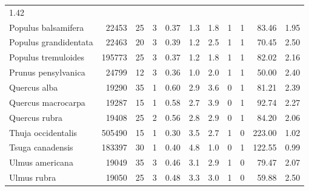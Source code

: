 \begin{longtable}[]{@{}lrrrrrrrrrr@{}}
1.42\tabularnewline
Populus balsamifera & 22453 & 25 & 3 & 0.37 & 1.3 & 1.8 & 1 & 1 & 83.46
& 1.95\tabularnewline
Populus grandidentata & 22463 & 20 & 3 & 0.39 & 1.2 & 2.5 & 1 & 1 &
70.45 & 2.50\tabularnewline
Populus tremuloides & 195773 & 25 & 3 & 0.37 & 1.2 & 1.8 & 1 & 1 & 82.02
& 2.16\tabularnewline
Prunus pensylvanica & 24799 & 12 & 3 & 0.36 & 1.0 & 2.0 & 1 & 1 & 50.00
& 2.40\tabularnewline
Quercus alba & 19290 & 35 & 1 & 0.60 & 2.9 & 3.6 & 0 & 1 & 81.21 &
2.39\tabularnewline
Quercus macrocarpa & 19287 & 15 & 1 & 0.58 & 2.7 & 3.9 & 0 & 1 & 92.74 &
2.27\tabularnewline
Quercus rubra & 19408 & 25 & 2 & 0.56 & 2.8 & 2.9 & 0 & 1 & 84.20 &
2.06\tabularnewline
Thuja occidentalis & 505490 & 15 & 1 & 0.30 & 3.5 & 2.7 & 1 & 0 & 223.00
& 1.02\tabularnewline
Tsuga canadensis & 183397 & 30 & 1 & 0.40 & 4.8 & 1.0 & 0 & 1 & 122.55 &
0.99\tabularnewline
Ulmus americana & 19049 & 35 & 3 & 0.46 & 3.1 & 2.9 & 1 & 0 & 79.47 &
2.07\tabularnewline
Ulmus rubra & 19050 & 25 & 3 & 0.48 & 3.3 & 3.0 & 1 & 0 & 59.88 &
2.50\tabularnewline
\bottomrule
\end{longtable}

